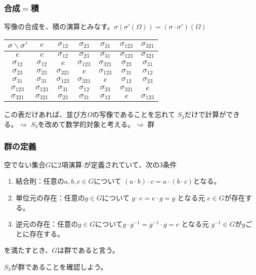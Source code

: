 \documentclass[12pt, t]{beamer}
\begin{document}
\begin{frame}
\frametitle{合成$=$積}
写像の合成を、積の演算とみなす。$\sigma(\sigma'(\Omega)) = (\sigma \cdot \sigma')(\Omega)$
\begin{center}
\begin{tabular}{c|cccccc}
  $\sigma \backslash \sigma'$ & $e$            & $\sigma_{12}$  & $\sigma_{23}$  & $\sigma_{31}$  & $\sigma_{123}$ & $\sigma_{321}$ \\ \hline
  $e$                         & $e$            & $\sigma_{12}$  & $\sigma_{23}$  & $\sigma_{31}$  & $\sigma_{123}$ & $\sigma_{321}$ \\
  $\sigma_{12}$               & $\sigma_{12}$  & $e$            & $\sigma_{123}$ & $\sigma_{321}$ & $\sigma_{23}$  & $\sigma_{31}$  \\
  $\sigma_{23}$               & $\sigma_{23}$  & $\sigma_{321}$ & $e$            & $\sigma_{123}$ & $\sigma_{31}$  & $\sigma_{12}$  \\
  $\sigma_{31}$               & $\sigma_{31}$  & $\sigma_{123}$ & $\sigma_{321}$ & $e$            & $\sigma_{12}$  & $\sigma_{23}$  \\
  $\sigma_{123}$              & $\sigma_{123}$ & $\sigma_{31}$  & $\sigma_{12}$  & $\sigma_{23}$  & $\sigma_{321}$ & $e$            \\
  $\sigma_{321}$              & $\sigma_{321}$ & $\sigma_{23}$  & $\sigma_{31}$  & $\sigma_{12}$  & $e$            & $\sigma_{123}$
\end{tabular}
\end{center}
この表だけあれば、並び方$\Omega$の写像であることを忘れて
$S_3$だけで計算ができる。$\rightsquigarrow$ $S_3$を改めて数学的対象と考える。$\rightsquigarrow$ 群
\end{frame}


\begin{frame}
\frametitle{群の定義}
空でない集合$G$に$2$項演算$\cdot$が定義されていて、次の$3$条件
\begin{enumerate}
\item 結合則：任意の$a, b, c \in G$について $(a \cdot b) \cdot c = a \cdot (b \cdot c)$となる。
\item 単位元の存在：任意の$g \in G$について $g \cdot e = e \cdot g = g$ となる元 $e \in G$が存在する。
\item 逆元の存在：任意の$g \in G$について$g \cdot g^{-1} = g^{-1} \cdot g = e$ となる元 $g^{-1} \in G$が$g$ごとに存在する。
\end{enumerate}
を満たすとき、$G$は群であると言う。

$S_3$が群であることを確認しよう。
\nocite{Hirai2001}
\end{frame}
\end{document}
